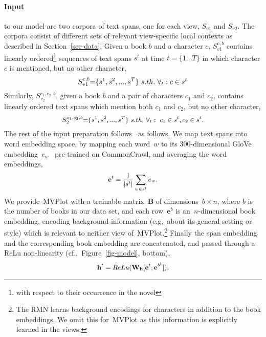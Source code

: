 \documentclass[11pt,letterpaper]{article}
\begin{document}
\paragraph{Input} to our model are two corpora of text spans, one for each view, $S_{v1}$ and $S_{v2}$. The corpora consist of different sets of relevant view-specific local contexts as described in Section~\ref{sec-data}. Given a book $b$ and a character $c$, $S^{c,b}_{v1}$ contains linearly ordered\footnote{with respect to their occurrence in the novel} sequences of text spans $s^t$ at time $t{=}\{1...T\}$ in which character $c$ is mentioned, but no other character, 
\begin{equation*}
\small
   S_{v1}^{c,b}       {=} \{s^1, s^2, ..., s^T\}\ s.th.\ \forall_t:c \in s^t \\
\end{equation*}
Similarly, $S^{c_1,c_2,b}_{v_2}$, given a book $b$ and a pair of characters $c_1$ and $c_2$, contains linearly ordered text spans which mention both $c_1$ and $c_2$, but no other character,
\begin{equation*}
\small
 \begin{aligned}
   S_{2}^{c_1,c_2,b} {=} \{s^1, s^2, ..., s^T\}\ s.th.\ \forall_t:\ c_1 \in s^t ,
                                                                   c_2 \in s^t.
 \end{aligned}
\end{equation*}
The rest of the input preparation follows~ as follows. We map text spans into word embedding space, by mapping each word~$w$ to its 300-dimensional GloVe embedding~${e}_w$~\citep{Pennington:2014} pre-trained on CommonCrawl, and averaging the word embeddings,
\begin{equation}
\small
 \begin{aligned}
  \mathbf{e}^t = \frac{1}{|s^t|} \sum_{w \in s^t} {e}_w.
 \end{aligned}
\end{equation}
We provide~\mbox{MVPlot} with a trainable matrix~$\mathbf{B}$ of dimensions~$b \times n$, where $b$ is the number of books in our data set, and each row~$\mathbf{e}^b$ is an~\mbox{$n$-dimensional} book embedding, encoding background information (e.g,~about its general setting or style) which is relevant to neither view of~\mbox{MVPlot}.\footnote{The RMN learns background encodings for characters in addition to the book embeddings. We omit this for~\mbox{MVPlot} as this information is explicitly learned in the views.}
Finally the span embedding and the corresponding book embedding are concatenated, and passed through a ReLu non-linearity (cf.,~Figure~\ref{fig-model}, bottom),
\begin{equation}
\small
 \begin{aligned}
  \label{eqn-hidden}
  \mathbf{h}^t = ReLu(\mathbf{W_h}[\mathbf{e}^t;\mathbf{e}^{b^t}]).
 \end{aligned}
\end{equation}
\end{document}
